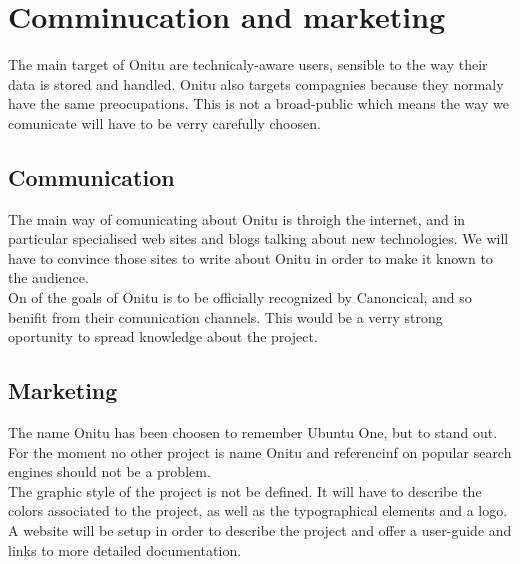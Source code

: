 \section{Comminucation and marketing}
The main target of Onitu are technicaly-aware users, sensible to the way their data is stored and handled. Onitu also targets compagnies because they normaly have the same preocupations. This is not a broad-public which means the way we comunicate will have to be verry carefully choosen.

\subsection{Communication}
The main way of comunicating about Onitu is throigh the internet, and in particular specialised web sites and blogs talking about new technologies. We will have to convince those sites to write about Onitu in order to make it known to the audience.\\

On of the goals of Onitu is to be officially recognized by Canoncical, and so benifit from their comunication channels. This would be a verry strong oportunity to spread knowledge about the project.\\

\subsection{Marketing}
The name Onitu has been choosen to remember Ubuntu One, but to stand out. For the moment no other project is name Onitu and referencinf on popular search engines should not be a problem.\\

The graphic style of the project is not be defined. It will have to describe the colors associated to the project, as well as the typographical elements and a logo.\\

A website will be setup in order to describe the project and offer a user-guide and links to more detailed documentation.

